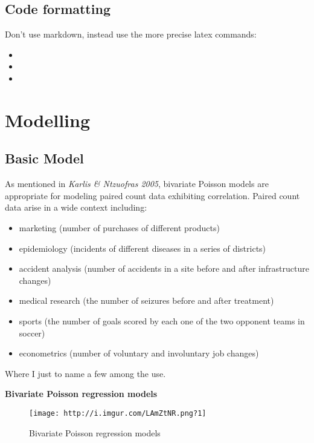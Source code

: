 \documentclass[article]{jss}
\providecommand{\tightlist}{%
  \setlength{\itemsep}{0pt}\setlength{\parskip}{0pt}}
\begin{document}
\subsection{Code formatting}\label{code-formatting}

Don't use markdown, instead use the more precise latex commands:

\begin{itemize}
\tightlist
\item
\item
\item
\end{itemize}

\section{Modelling}\label{modelling}

\subsection{Basic Model}\label{basic-model}

As mentioned in \emph{Karlis \& Ntzuofras 2005}, bivariate Poisson
models are appropriate for modeling paired count data exhibiting
correlation. Paired count data arise in a wide context including:

\begin{itemize}
\tightlist
\item
  marketing (number of purchases of different products)
\item
  epidemiology (incidents of different diseases in a series of
  districts)
\item
  accident analysis (number of accidents in a site before and after
  infrastructure changes)
\item
  medical research (the number of seizures before and after treatment)
\item
  sports (the number of goals scored by each one of the two opponent
  teams in soccer)
\item
  econometrics (number of voluntary and involuntary job changes)
\end{itemize}

Where I just to name a few among the use. \bigbreak

\textbf{Bivariate Poisson regression models}

\begin{figure}[htbp]
\centering
\texttt{[image: http://i.imgur.com/LAmZtNR.png?1]}
\caption{Bivariate Poisson regression models}
\end{figure}
\end{document}
